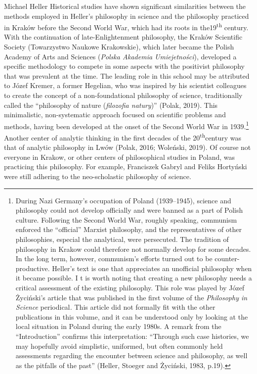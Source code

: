 \begin{artengenv}{Michael Heller}
Historical studies have shown significant similarities between the methods employed in Heller’s philosophy in science
and the philosophy practiced in Kraków before the Second World War, which had its roots in the19\textsuperscript{th}
century. With the continuation of late-Enlightenment philosophy, the Kraków Scientific Society (Towarzystwo Naukowe
Krakowskie), which later became the Polish Academy of Arts and Sciences (\textit{Polska Akademia Umiejetności}),
developed a specific methodology to compete in some aspects with the positivist philosophy that was prevalent at the
time. The leading role in this school may be attributed to Józef Kremer, a former Hegelian, who was inspired by his
scientist colleagues to create the concept of a non-foundational philosophy of science, traditionally called the
“philosophy of nature (\textit{filozofia natury})” (Polak, 2019). This minimalistic, non-systematic approach focused on
scientific problems and methods, having been developed at the onset of the Second World War in 1939.\footnote{During
Nazi Germany’s occupation of Poland (1939–1945), science and philosophy could not develop officially and were banned as
a part of Polish culture. Following the Second World War, roughly speaking, communism enforced the “official” Marxist
philosophy, and the representatives of other philosophies, especial the analytical, were persecuted. The tradition of
philosophy in Krakow could therefore not normally develop for some decades. In the long term, however, communism’s
efforts turned out to be counter-productive. Heller’s text is one that appreciates an unofficial philosophy when it
became possible. I t is worth noting that creating a new philosophy needs a critical assessment of the existing
philosophy. This role was played by Józef Życiński's article that was published in the first volume of the
\textit{Philosophy in Science }periodical\textit{.} This article did not formally fit with the other publications in
this volume, and it can be understood only by looking at the local situation in Poland during the early 1980s. A remark
from the “Introduction” confirms this interpretation: “Through such case histories, we may hopefully avoid simplistic,
uniformed, but often commonly held assessments regarding the encounter between science and philosophy, as well as the
pitfalls of the past” (Heller, Stoeger and Życiński, 1983, p.19).} Another center of analytic
thinking in the first decades of the 20\textsuperscript{th}century was that of analytic philosophy in Lwów (Polak,
2016; Woleński, 2019). Of course not everyone in Krakow, or other centers of philosophical studies in Poland, was
practicing this philosophy. For example, Franciszek Gabryl and Feliks Hortyński were still adhering to the
neo-scholastic philosophy of science.


\end{artengenv}
